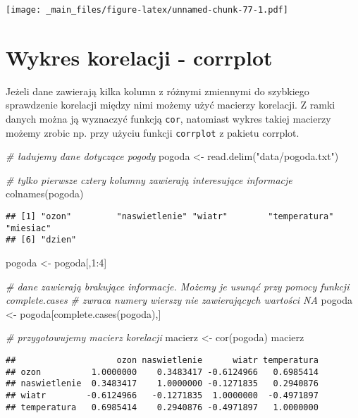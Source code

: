 \documentclass[
]{book}
\newenvironment{Shaded}{\begin{snugshade}}{\end{snugshade}}
\newcommand{\CommentTok}[1]{\textcolor[rgb]{0.56,0.35,0.01}{\textit{#1}}}
\newcommand{\DecValTok}[1]{\textcolor[rgb]{0.00,0.00,0.81}{#1}}
\newcommand{\FunctionTok}[1]{\textcolor[rgb]{0.00,0.00,0.00}{#1}}
\newcommand{\NormalTok}[1]{#1}
\newcommand{\OtherTok}[1]{\textcolor[rgb]{0.56,0.35,0.01}{#1}}
\newcommand{\SpecialCharTok}[1]{\textcolor[rgb]{0.00,0.00,0.00}{#1}}
\newcommand{\StringTok}[1]{\textcolor[rgb]{0.31,0.60,0.02}{#1}}
\begin{document}
\texttt{[image: \_main\_files/figure-latex/unnamed-chunk-77-1.pdf]}

\hypertarget{wykres-korelacji---corrplot}{%
\section{Wykres korelacji - corrplot}\label{wykres-korelacji---corrplot}}

Jeżeli dane zawierają kilka kolumn z różnymi zmiennymi do szybkiego sprawdzenie korelacji między nimi możemy użyć macierzy korelacji. Z ramki danych można ją wyznaczyć funkcją \texttt{cor}, natomiast wykres takiej macierzy możemy zrobic np. przy użyciu funkcji \texttt{corrplot} z pakietu corrplot.

\begin{Shaded}
\begin{Highlighting}[]
\CommentTok{\# ładujemy dane dotyczące pogody}
\NormalTok{pogoda }\OtherTok{\textless{}{-}} \FunctionTok{read.delim}\NormalTok{(}\StringTok{"data/pogoda.txt"}\NormalTok{)}

\CommentTok{\# tylko pierwsze cztery kolumny zawierają interesujące informacje}
\FunctionTok{colnames}\NormalTok{(pogoda)}
\end{Highlighting}
\end{Shaded}

\begin{verbatim}
## [1] "ozon"         "naswietlenie" "wiatr"        "temperatura"  "miesiac"     
## [6] "dzien"
\end{verbatim}

\begin{Shaded}
\begin{Highlighting}[]
\NormalTok{pogoda }\OtherTok{\textless{}{-}}\NormalTok{ pogoda[,}\DecValTok{1}\SpecialCharTok{:}\DecValTok{4}\NormalTok{]}

\CommentTok{\# dane zawierają brakujące informacje. Możemy je usunąć przy pomocy funkcji complete.cases}
\CommentTok{\# zwraca numery wierszy nie zawierających wartości NA}
\NormalTok{pogoda }\OtherTok{\textless{}{-}}\NormalTok{ pogoda[}\FunctionTok{complete.cases}\NormalTok{(pogoda),]}

\CommentTok{\# przygotowujemy macierz korelacji}
\NormalTok{macierz }\OtherTok{\textless{}{-}} \FunctionTok{cor}\NormalTok{(pogoda)}
\NormalTok{macierz}
\end{Highlighting}
\end{Shaded}

\begin{verbatim}
##                    ozon naswietlenie      wiatr temperatura
## ozon          1.0000000    0.3483417 -0.6124966   0.6985414
## naswietlenie  0.3483417    1.0000000 -0.1271835   0.2940876
## wiatr        -0.6124966   -0.1271835  1.0000000  -0.4971897
## temperatura   0.6985414    0.2940876 -0.4971897   1.0000000
\end{verbatim}
\end{document}

